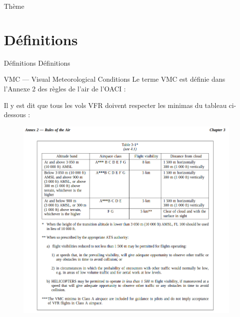 \documentclass{beamer}
\begin{document}
\begin{frame}{Thème}
  \tableofcontents
\end{frame}

\section{Définitions}
\begin{frame}{Définitions}
  \LARGE{Définitions}
\end{frame}

\begin{frame}{VMC — Visual Meteorological Conditions}
  Le terme VMC est définie dans l'Annexe 2 des règles de l'air de l'OACI :

  Il y est dit que tous les vols VFR doivent respecter les minimas du tableau ci-dessous :

  \pause
  \begin{figure}
    \centering
    \includegraphics[scale=1]{images/rule-of-air.png}
  \end{figure}
\end{frame}
\end{document}
